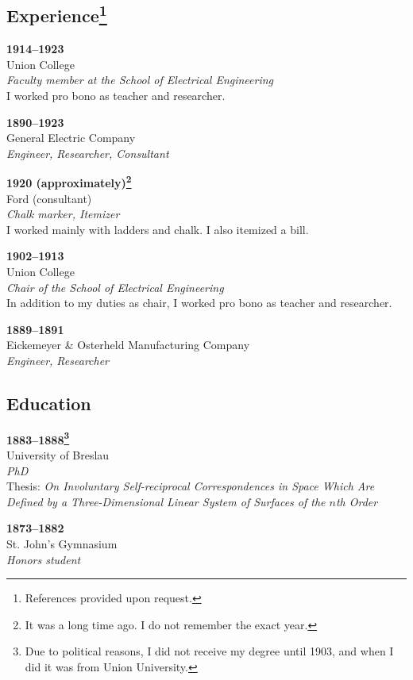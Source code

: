 \documentclass[a4paper]{article}
\begin{document}
\subsection*{Experience\footnote{References provided upon request.}}
\textbf{1914--1923}                                             \\
Union College                                                   \\
\textit{Faculty member at the School of Electrical Engineering} \\
I worked pro bono as teacher and researcher.
\par
\textbf{1890--1923}      \\
General Electric Company \\
\textit{Engineer, Researcher, Consultant}
\par
\textbf{1920 (approximately)\footnote{%
  It was a long time ago. I do not remember the exact year.
}}                                                             \\
Ford (consultant)                                              \\
\textit{Chalk marker, Itemizer}                                \\
I worked mainly with ladders and chalk. I also itemized a bill.
\par
\textbf{1902--1913}                                    \\
Union College                                          \\
\textit{Chair of the School of Electrical Engineering} \\
In addition to my duties as chair, I worked pro bono as teacher and researcher.
\par
\textbf{1889--1891}                           \\
Eickemeyer \& Osterheld Manufacturing Company \\
\textit{Engineer, Researcher}
\subsection*{Education}
\textbf{1883--1888\footnote{%
  Due to political reasons, I did not receive my degree until 1903, and when I
  did it was from Union University.%
}}                                                                            \\
University of Breslau                                                         \\
\textit{PhD}                                                                  \\
Thesis:\@ \textit{%
  On Involuntary Self-reciprocal Correspondences in Space Which Are Defined by a
  Three-Dimensional Linear System of Surfaces of the $n$th Order%
}
\par
\textbf{1873--1882}  \\
St. John's Gymnasium \\
\textit{Honors student}
\end{document}
